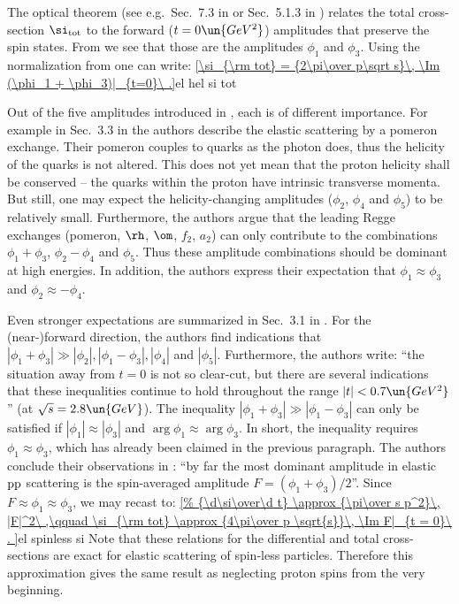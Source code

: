 The optical theorem (see e.g.~Sec.~7.3 in  or Sec.~5.1.3 in ) relates the total cross-section $\si_{\rm tot}$ to the forward ($t=0\un{GeV^2}$) amplitudes that preserve the spin states. From  we see that those are the amplitudes $\phi_1$ and $\phi_3$. Using the normalization from  one can write:
\eqref{\si_{\rm tot} = {2\pi\over p\sqrt s}\, \Im (\phi_1 + \phi_3)|_{t=0}\ .}{el hel si tot}

Out of the five amplitudes introduced in , each is of different importance. For example in Sec.~3.3 in  the authors describe the elastic scattering by a pomeron exchange. Their pomeron couples to quarks as the photon does, thus the helicity of the quarks is not altered. This does not yet mean that the proton helicity shall be conserved -- the quarks within the proton have intrinsic transverse momenta. But still, one may expect the helicity-changing amplitudes ($\phi_2$, $\phi_4$ and $\phi_5$) to be relatively small. Furthermore, the authors argue that the leading Regge exchanges (pomeron, $\rm\rh$, $\rm\om$, $f_2$, $a_2$) can only contribute to the combinations $\phi_1+\phi_3$, $\phi_2 - \phi_4$ and $\phi_5$. Thus these amplitude combinations should be dominant at high energies. In addition, the authors express their expectation that $\phi_1 \approx \phi_3$ and $\phi_2 \approx - \phi_4$.

Even stronger expectations are summarized in Sec.~3.1 in . For the (near-)forward direction, the authors find indications that $|\phi_1 + \phi_3| \gg |\phi_2|, |\phi_1-\phi_3|, |\phi_4|$ and $|\phi_5|$. Furthermore, the authors write: ``the situation away from $t=0$ is not so clear-cut, but there are several indications that these inequalities continue to hold throughout the range $|t| < 0.7\un{GeV^2}$'' (at $\sqrt s = 2.8\un{GeV}$). The inequality $|\phi_1 + \phi_3| \gg |\phi_1-\phi_3|$ can only be satisfied if $|\phi_1| \approx |\phi_3|$ and $\arg\phi_1 \approx \arg\phi_3$. In short, the inequality requires $\phi_1 \approx \phi_3$, which has already been claimed in the previous paragraph. The authors conclude their observations in : ``by far the most dominant amplitude in elastic $\rm pp$ scattering is the spin-averaged amplitude $F = (\phi_1+\phi_3)/2$''. Since $F\approx \phi_1 \approx \phi_3$, we may recast  to:
\eqref{%
	{\d\si\over\d t} \approx {\pi\over s p^2}\, |F|^2\ ,\qquad
	\si_{\rm tot} \approx {4\pi\over p \sqrt{s}}\, \Im F|_{t = 0}\ .
}{el spinless si}
Note that these relations for the differential and total cross-sections are exact for elastic scattering of spin-less particles. Therefore this approximation gives the same result as neglecting proton spins from the very beginning.

